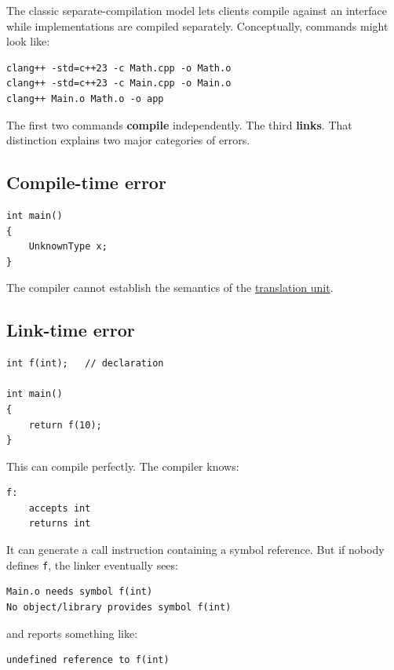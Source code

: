 The classic separate-compilation model lets clients compile against an interface while implementations are compiled separately. Conceptually, commands might look like:

\begin{verbatim}
clang++ -std=c++23 -c Math.cpp -o Math.o
clang++ -std=c++23 -c Main.cpp -o Main.o
clang++ Main.o Math.o -o app
\end{verbatim}

The first two commands \textbf{compile} independently. The third \textbf{links}. That distinction explains two major categories of errors.

\subsection{Compile-time error}\label{01-foundations-i-ch002-compile-time-error}

\begin{verbatim}
int main()
{
    UnknownType x;
}
\end{verbatim}

The compiler cannot establish the semantics of the \hyperref[appendix-806686359e1b]{translation unit}.

\subsection{Link-time error}\label{01-foundations-i-ch002-link-time-error}

\begin{verbatim}
int f(int);   // declaration

int main()
{
    return f(10);
}
\end{verbatim}

This can compile perfectly. The compiler knows:

\begin{verbatim}
f:
    accepts int
    returns int
\end{verbatim}

It can generate a call instruction containing a symbol reference. But if nobody defines \texttt{f}, the linker eventually sees:

\begin{verbatim}
Main.o needs symbol f(int)
No object/library provides symbol f(int)
\end{verbatim}

and reports something like:

\begin{verbatim}
undefined reference to f(int)
\end{verbatim}

